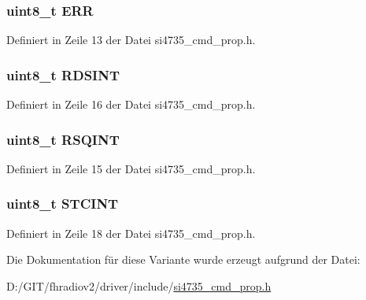 \subsubsection[{E\+R\+R}]{\setlength{\rightskip}{0pt plus 5cm}uint8\+\_\+t {\bf E\+R\+R}}\label{unionint__status_afb74dff3cfacd68c02883e5282ef2f59}


Definiert in Zeile 13 der Datei si4735\+\_\+cmd\+\_\+prop.\+h.

\hypertarget{unionint__status_a4fac7351844086822dbf634529f6cfbd}{}
\subsubsection[{R\+D\+S\+I\+N\+T}]{\setlength{\rightskip}{0pt plus 5cm}uint8\+\_\+t R\+D\+S\+I\+N\+T}\label{unionint__status_a4fac7351844086822dbf634529f6cfbd}


Definiert in Zeile 16 der Datei si4735\+\_\+cmd\+\_\+prop.\+h.

\hypertarget{unionint__status_a9637ec0bb6d40570ea68a1b96c5d561e}{}
\subsubsection[{R\+S\+Q\+I\+N\+T}]{\setlength{\rightskip}{0pt plus 5cm}uint8\+\_\+t R\+S\+Q\+I\+N\+T}\label{unionint__status_a9637ec0bb6d40570ea68a1b96c5d561e}


Definiert in Zeile 15 der Datei si4735\+\_\+cmd\+\_\+prop.\+h.

\hypertarget{unionint__status_a1026d3a63b328db2451abc49e0bd5a2c}{}
\subsubsection[{S\+T\+C\+I\+N\+T}]{\setlength{\rightskip}{0pt plus 5cm}uint8\+\_\+t S\+T\+C\+I\+N\+T}\label{unionint__status_a1026d3a63b328db2451abc49e0bd5a2c}


Definiert in Zeile 18 der Datei si4735\+\_\+cmd\+\_\+prop.\+h.



Die Dokumentation für diese Variante wurde erzeugt aufgrund der Datei\+:\begin{DoxyCompactItemize}
\item 
D\+:/\+G\+I\+T/fhradiov2/driver/include/\hyperlink{si4735__cmd__prop_8h}{si4735\+\_\+cmd\+\_\+prop.\+h}\end{DoxyCompactItemize}
